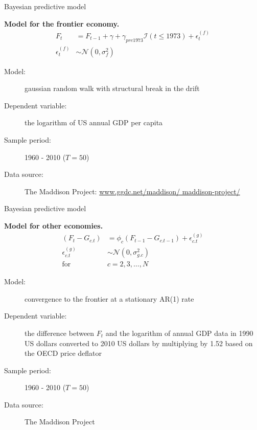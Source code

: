 \documentclass[notes,blackandwhite,mathsans,usenames,dvipsnames]{beamer}
\begin{document}
\begin{frame}{Bayesian predictive model}

\textbf{Model for the frontier economy.}
\begin{align*}
F_t &= F_{t-1} + \gamma +\gamma_{pre 1973}\mathcal{I}(t\leq 1973) + \epsilon_t^{(f)}\\
\epsilon_t^{(f)} &\sim\mathcal{N}\left( 0,\sigma_f^2 \right)
\end{align*}

\smallskip\begin{description}
\item[Model:] gaussian random walk with structural break in the drift

\smallskip\item[Dependent variable:] the logarithm of US annual GDP per capita

\smallskip\item[Sample period:] 1960 - 2010 ($T=50$)

\smallskip\item[Data source:] The Maddison Project: \href{http://www.ggdc.net/maddison/ maddison-project/}{www.ggdc.net/maddison/ maddison-project/}

\end{description}

\end{frame}




\begin{frame}{Bayesian predictive model}

\bigskip\textbf{Model for other economies.}
\begin{align*}
(F_t - G_{c.t}) &= \phi_c(F_{t-1}- G_{c.t-1}) + \epsilon_{c.t}^{(g)}\\
\epsilon_{c.t}^{(g)} &\sim\mathcal{N}\left( 0,\sigma_{g.c}^2 \right)\\[2ex]
\text{for } &  c=2,3,\dots,N
\end{align*}

\smallskip\begin{description}
\item[Model:] convergence to the frontier at a stationary AR(1) rate

\smallskip\item[Dependent variable:] the difference between $F_t$ and the logarithm of annual GDP data in 1990 US dollars converted to 2010 US dollars by multiplying by 1.52 based on the OECD price deflator

\smallskip\item[Sample period:] 1960 - 2010 ($T=50$)

\smallskip\item[Data source:] The Maddison Project

\end{description}

\end{frame}
\end{document}
